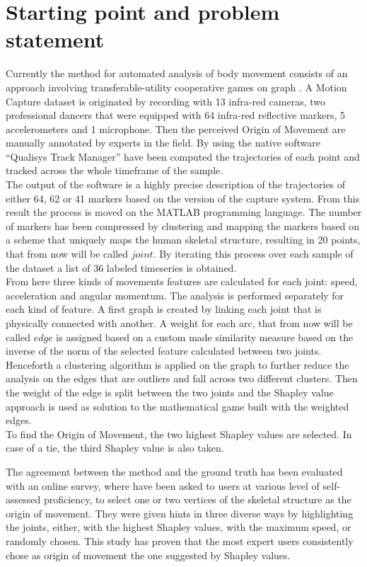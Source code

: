 \section{Starting point and problem statement}
Currently the method for automated analysis of body movement consists of an approach involving transferable-utility cooperative games on graph \cite{kolykhalova:2020}.
A Motion Capture dataset is originated by recording with 13 infra-red cameras, two professional dancers that were equipped with 64 infra-red reflective markers, 5 accelerometers and 1 microphone.
Then the perceived Origin of Movement are manually annotated by experts in the field.
By using the native software “Qualisys Track Manager” have been computed the trajectories of each point and tracked across the whole timeframe of the sample.\\
The output of the software is a highly precise description of the trajectories of either 64, 62 or 41 markers based on the version of the capture system. 
From this result the process is moved on the MATLAB programming language. 
The number of markers has been compressed by clustering and mapping the markers based on a scheme that uniquely maps the human skeletal structure, resulting in 20 points, that from now will be called $joint$.
By iterating this process over each sample of the dataset a list of 36 labeled timeseries is obtained.\\
From here three kinds of movements features are calculated for each joint: speed, acceleration and angular momentum.
The analysis is performed separately for each kind of feature.
A first graph is created by linking each joint that is physically connected with another.
A weight for each arc, that from now will be called $edge$ is assigned based on a custom made similarity measure based on the inverse of the norm of the selected feature calculated between two joints.
Henceforth a clustering algorithm is applied on the graph to further reduce the analysis on the edges that are outliers and fall across two different clusters.
Then the weight of the edge is split between the two joints and the Shapley value approach is used as solution to the mathematical game built with the weighted edges.\\
To find the Origin of Movement, the two highest Shapley values are selected. In case of a tie, the third Shapley value is also taken.

The agreement between the method and the ground truth has been evaluated with an online survey, where have been asked to users at various level of self-assessed proficiency, 
to select one or two vertices of the skeletal structure as the origin of movement.
They were given hints in three diverse ways by highlighting the joints, either, 
with the highest Shapley values, with the maximum speed, or randomly chosen. 
This study has proven that the most expert users consistently chose as origin of movement the one suggested by Shapley values. \\

